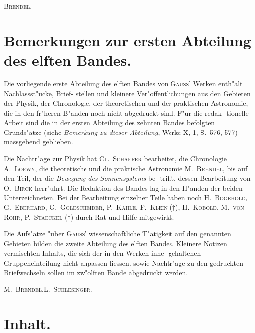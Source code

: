 \documentclass[12pt,a4paper]{article}
\theoremstyle{plain}
\theoremstyle{definition}
\theoremstyle{remark}
\begin{document}
\begin{flushright}
\textsc{Brendel.}
\end{flushright}

\newpage
\section*{Bemerkungen zur ersten Abteilung des elften Bandes.}

Die vorliegende erste Abteilung des elften Bandes von \textsc{Gauss}' Werken enth"alt Nachlassst"ucke, Brief-
stellen und kleinere Ver"offentlichungen aus den Gebieten der Physik, der Chronologie, der theoretischen
und der praktischen Astronomie, die in den fr"heren B"anden noch nicht abgedruckt sind. F"ur die redak-
tionelle Arbeit sind die in der ersten Abteilung des zehnten Bandes befolgten Grunds"atze (siehe \textit{Bemerkung
zu dieser Abteilung}, Werke \textsc{X}, 1, S.~576, 577) massgebend geblieben.

Die Nachtr"age zur Physik hat \textsc{Cl.\ Schaefer} bearbeitet, die Chronologie \textsc{A.\ Loewy}, die theoretische
und die praktische Astronomie \textsc{M.\ Brendel}, bis auf den Teil, der die \textit{Bewegung des Sonnensystems} be-
trifft, dessen Bearbeitung von \textsc{O.\ Birck} herr"uhrt. Die Redaktion des Bandes lag in den H"anden der
beiden Unterzeichneten. Bei der Bearbeitung einzelner Teile haben noch \textsc{H.\ Bogehold}, \textsc{G.\ Eberhard},
\textsc{G.\ Goldscheider}, \textsc{P.\ Kahle}, \textsc{F.\ Klein} ($\dagger$), \textsc{H.\ Kobold}, \textsc{M.\ von Rohr}, \textsc{P.\ Staeckel} ($\dagger$) durch Rat
und Hilfe mitgewirkt.

Die Aufs"atze "uber \textsc{Gauss}' wissenschaftliche T"atigkeit auf den genannten Gebieten bilden die zweite
Abteilung des elften Bandes. Kleinere Notizen vermischten Inhalts, die sich der in den Werken inne-
gehaltenen Gruppeneinteilung nicht anpassen liessen, sowie Nachtr"age zu den gedruckten Briefwechseln
sollen im zw"olften Bande abgedruckt werden.

\begin{flushright}
\textsc{M.\ Brendel.\quad L.\ Schlesinger.}
\end{flushright}

\newpage
\section*{Inhalt.}
\end{document}

